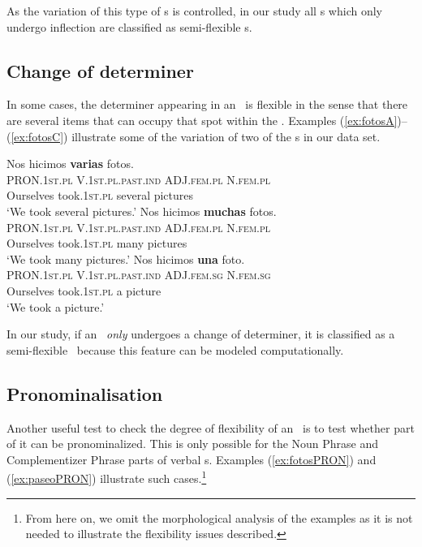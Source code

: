 \documentclass[output=paper]{langsci/langscibook}
\begin{document}
As the variation of this type of \mwe s is controlled, in our study all \mwe s which only undergo inflection are classified as semi-flexible \mwe s.

\subsection{Change of determiner}
\label{ssec:changeDet}

In some cases, the determiner appearing in an \mwe\ is flexible in the sense that there are several items that can occupy that spot within the \mwe.
Examples (\ref{ex:fotosA})--(\ref{ex:fotosC}) illustrate some of the variation of two of the \mwe s in our data set.

\begin{exe}
\ex 
	\begin{xlist}
	\ex \label{ex:fotosA}
    \glll Nos hicimos \textbf{varias} fotos. \\
   \textsc{PRON.1st.pl} \textsc{V.1st.pl.past.ind} \textsc{ADJ.fem.pl} \textsc{N.fem.pl} \\
    Ourselves {took.\textsc{1st.pl}} several pictures\\
    \glt `We took several pictures.'
	\ex \label{ex:fotosB}
    \glll Nos hicimos \textbf{muchas} fotos. \\
    \textsc{PRON.1st.pl} \textsc{V.1st.pl.past.ind} \textsc{ADJ.fem.pl} \textsc{N.fem.pl} \\
    Ourselves {took.\textsc{1st.pl}} many pictures\\
    \glt `We took many pictures.'
	\ex \label{ex:fotosC}
    \glll Nos hicimos \textbf{una} foto. \\
    \textsc{PRON.1st.pl} \textsc{V.1st.pl.past.ind} \textsc{ADJ.fem.sg} \textsc{N.fem.sg} \\
    Ourselves {took.\textsc{1st.pl}} a picture\\
    \glt `We took a picture.'
	\end{xlist}
\end{exe}

In our study, if an \mwe\ \textit{only} undergoes a change of determiner, it is classified as a semi-flexible \mwe\ because this feature can be modeled computationally.

\subsection{Pronominalisation}
\label{ssec:pronominalisation}

Another useful test to check the degree of flexibility of an \mwe\ is to test whether part of it can be pronominalized.
This is only possible for the Noun Phrase and Complementizer Phrase parts of verbal \mwe s.
Examples (\ref{ex:fotosPRON}) and (\ref{ex:paseoPRON}) illustrate such cases.\footnote{From here on, we omit the morphological analysis of the examples as it is not needed to illustrate the flexibility issues described.}
\end{document}
